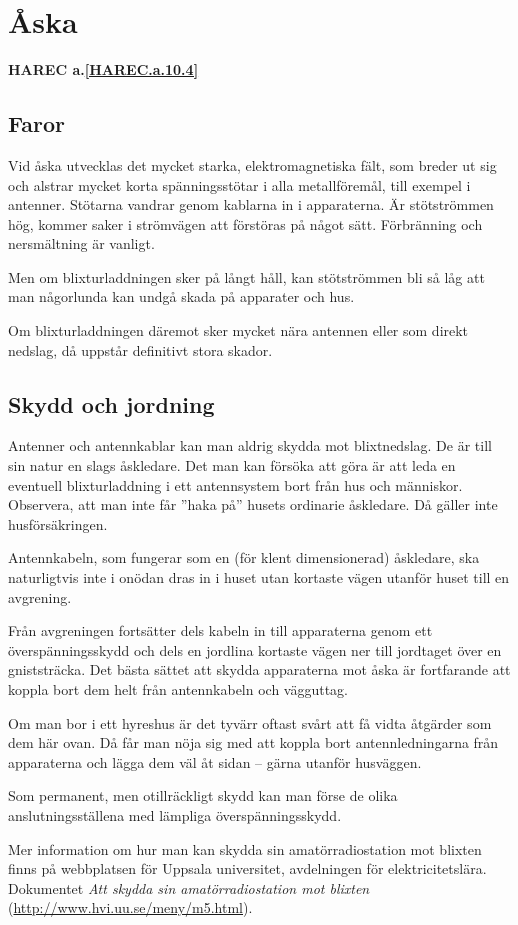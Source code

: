 \section{Åska}
\textbf{
HAREC a.\ref{HAREC.a.10.4}\label{myHAREC.a.10.4}
}

\subsection{Faror}

Vid åska utvecklas det mycket starka, elektromagnetiska fält, som breder ut sig
och alstrar mycket korta spänningsstötar i alla metallföremål, till exempel i antenner.
Stötarna vandrar genom kablarna in i apparaterna.
Är stötströmmen hög, kommer saker i strömvägen att förstöras på något sätt.
Förbränning och nersmältning är vanligt.

Men om blixturladdningen sker på långt håll, kan stötströmmen bli så låg att
man någorlunda kan undgå skada på apparater och hus.

Om blixturladdningen däremot sker mycket nära antennen eller som direkt nedslag,
då uppstår definitivt stora skador.

\subsection{Skydd och jordning}

Antenner och antennkablar kan man aldrig skydda mot blixtnedslag.
De är till sin natur en slags åskledare.
Det man kan försöka att göra är att leda en eventuell blixturladdning i ett
antennsystem bort från hus och människor.
Observera, att man inte får ''haka på'' husets ordinarie åskledare.
Då gäller inte husförsäkringen.

Antennkabeln, som fungerar som en (för klent dimensionerad) åskledare,
ska naturligtvis inte i onödan dras in i huset utan kortaste vägen
utanför huset till en avgrening.

Från avgreningen fortsätter dels kabeln in till apparaterna genom ett
överspänningsskydd och dels en jordlina kortaste vägen ner till
jordtaget över en gniststräcka.
Det bästa sättet att skydda apparaterna mot åska är fortfarande att koppla bort
dem helt från antennkabeln och vägguttag.

Om man bor i ett hyreshus är det tyvärr oftast svårt att få vidta
åtgärder som dem här ovan.
Då får man nöja sig med att koppla bort antennledningarna från apparaterna och
lägga dem väl åt sidan -- gärna utanför husväggen.

Som permanent, men otillräckligt skydd kan man förse de olika
anslutningsställena med lämpliga överspänningsskydd.

Mer information om hur man kan skydda sin amatörradiostation mot blixten
finns på webbplatsen för Uppsala universitet, avdelningen för elektricitetslära.
Dokumentet \emph{Att skydda sin amatörradiostation mot blixten}
(\url{http://www.hvi.uu.se/meny/m5.html}).
